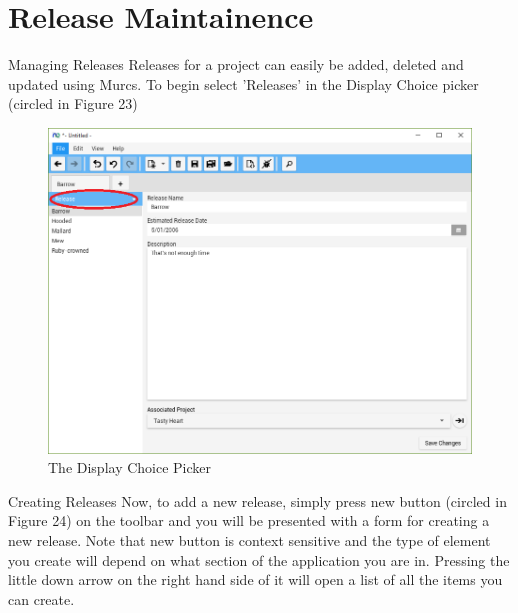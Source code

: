 \section{Release Maintainence}

Managing Releases
\newline
Releases for a project can easily be added, deleted and updated using Murcs. To begin select 'Releases' in the Display Choice picker (circled in Figure 23)

\begin{figure}[H]
\centering
\includegraphics[width=\textwidth]{images/screenshots/releases1.PNG}
\caption{The Display Choice Picker}
\label{fig:new_project}
\end{figure}

Creating Releases
\newline
Now, to add a new release, simply press new button (circled in Figure 24) on the toolbar and you will be presented with a form for creating a new release. Note that new button is context sensitive and the type of element you create will depend on what section of the application you are in. Pressing the little down arrow on the right hand side of it will open a list of all the items you can create.

